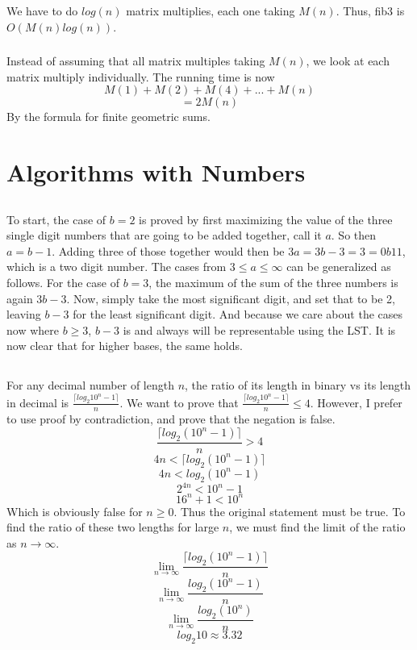 \documentclass{article}
\newcommand\ceil[1]{\lceil#1\rceil}
\begin{document}
\subsubsection{}We have to do $log(n)$ matrix multiplies, each one taking $M(n)$. Thus, fib3 is $O(M(n)log(n))$.
\subsubsection{}Instead of assuming that all matrix multiples taking $M(n)$, we look at each matrix multiply individually. The running time is now $$M(1)+M(2)+M(4)+...+M(n)$$
$$=2M(n)$$
By the formula for finite geometric sums. 
\section{Algorithms with Numbers}
\subsection{} To start, the case of $b=2$ is proved by first maximizing the value of the three single digit numbers that are going to be added together, call it $a$. So then $a=b-1$. Adding three of those together would then be $3a=3b-3=3=0b11$, which is a two digit number. The cases from $3 \leq a \leq \infty$ can be generalized as follows. For the case of $b=3$, the maximum of the sum of the three numbers is again $3b-3$. Now, simply take the most significant digit, and set that to be 2, leaving $b-3$ for the least significant digit. And because we care about the cases now where $b \geq 3$, $b-3$ is and always will be representable using the LST. It is now clear that for higher bases, the same holds. 
\subsection{} For any decimal number of length $n$, the ratio of its length in binary vs its length in decimal is $\frac{\ceil{log_2{10^n-1}}}{n}$. We want to prove that $\frac{\ceil{log_2{10^n-1}}}{n} \leq 4$. However, I prefer to use proof by contradiction, and prove that the negation is false. $$\frac{\ceil{log_2{(10^n-1)}}}{n} > 4$$
$$4n<\ceil{log_2{(10^n-1)}}$$
$$4n<log_2{(10^n-1)}$$
$$2^{4n}<10^n-1$$
$$16^n+1<10^n$$
Which is obviously false for $n \geq 0$. Thus the original statement must be true. 
To find the ratio of these two lengths for large $n$, we must find the limit of the ratio as $n \rightarrow \infty$.
$$\lim_{n \rightarrow \infty}\frac{\ceil{log_2{(10^n-1)}}}{n}$$
$$\lim_{n \rightarrow \infty}\frac{log_2{(10^n-1)}}{n}$$
$$\lim_{n \rightarrow \infty}\frac{log_2{(10^n)}}{n}$$
$$log_2{10} \approx 3.32$$
\end{document}
